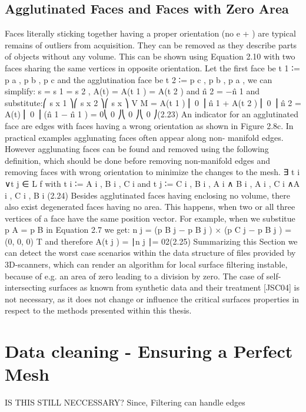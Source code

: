 \documentclass[openany]{book}
\begin{document}
\subsection{Agglutinated Faces and Faces with Zero Area}
Faces literally sticking together having a proper orientation (no e + ) are typical remains
of outliers from acquisition. They can be removed as they describe parts of objects
without any volume. This can be shown using Equation 2.10 with two faces sharing
the same vertices in opposite orientation. Let the first face be t 1 ∶= {p a , p b , p c } and the
agglutination face be t 2 ∶= {p c , p b , p a }, we can simplify: s = s 1 = s 2 , A(t) = 
A(t 1 ) = A(t 2 ) and n̂ 2 = −n̂ 1 and substitute:⎛ s x 1 ⎞⎛ s x 2 ⎞⎛ s x ⎞
V M = A(t 1 ) ⎜ 0 ⎟ n̂ 1 + A(t 2 ) ⎜ 0 ⎟ n̂ 2 = A(t) ⎜ 0 ⎟ (n̂ 1 − n̂ 1 ) = 0⎝ 0 ⎠⎝ 0 ⎠⎝ 0 ⎠(2.23)
An indicator for an agglutinated face are edges with faces having a wrong orientation as
shown in Figure 2.8c. In practical examples agglunating faces often appear along non-
manifold edges. However agglunating faces can be found and removed using the following
definition, which should be done before removing non-manifold edges and removing faces
with wrong orientation to minimize the changes to the mesh.
∃ t i ∨t j ∈ L f with t i ∶= {A i , B i , C i } and t j ∶= {C i , B i , A i }∧
{B i , A i , C i }∧{A i , C i , B i } (2.24)
Besides agglutinated faces having enclosing no volume, there also exist degenerated
faces having no area. This happens, when two or all three vertices of a face have the same
position vector. For example, when we substitue p A = p B in Equation 2.7 we get:
n j = (p B j − p B j ) × (p C j − p B j ) = (0, 0, 0) T and therefore A(t j ) =
∣n j ∣= 02(2.25)
Summarizing this Section we can detect the worst case scenarios within the data
structure of files provided by 3D-scanners, which can render an algorithm for local surface
filtering instable, because of e.g. an area of zero leading to a division by zero. The case
of self-intersecting surfaces as known from synthetic data and their treatment [JSC04] is
not necessary, as it does not change or influence the critical surfaces properties in respect
to the methods presented within this thesis.~\cite[p.~32]{Mara12}



\section{Data cleaning - Ensuring a Perfect Mesh} 
IS THIS STILL NECCESSARY? Since, Filtering can handle edges
\end{document}
